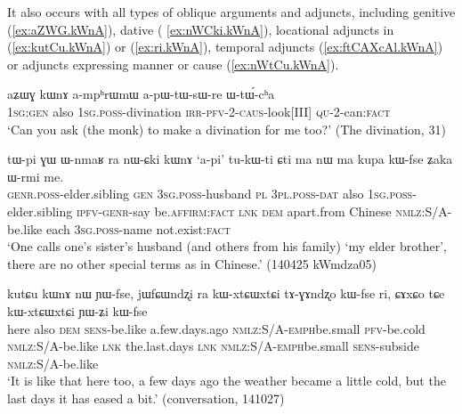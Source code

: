 It also occurs with all types of oblique arguments and adjuncts, including genitive (\ref{ex:aZWG.kWnA}), dative ( \ref{ex:nWCki.kWnA}),  locational adjuncts in  (\ref{ex:kutCu.kWnA}) or  (\ref{ex:ri.kWnA}), temporal adjuncts (\ref{ex:ftCAXcAl.kWnA}) or adjuncts expressing manner or cause (\ref{ex:nWtCu.kWnA}).  
  
   \begin{exe}
\ex \label{ex:aZWG.kWnA}
\gll aʑɯɣ kɯnɤ a-mpʰrɯmɯ a-pɯ-tɯ-sɯ-re ɯ-tɯ́-cʰa \\
\textsc{1sg}:\textsc{gen} also \textsc{1sg}.\textsc{poss}-divination \textsc{irr}-\textsc{pfv}-2-\textsc{caus}-look[III] \textsc{qu}-2-can:\textsc{fact} \\
\glt `Can you ask (the monk) to make a divination for me too?' (The divination, 31)
\end{exe}  
  
   \begin{exe}
\ex \label{ex:nWCki.kWnA}
\gll  tɯ-pi ɣɯ ɯ-nmaʁ ra nɯ-ɕki kɯnɤ `a-pi' tu-kɯ-ti ɕti ma nɯ ma kupa kɯ-fse ʑaka ɯ-rmi me. \\
\textsc{genr}.\textsc{poss}-elder.sibling \textsc{gen} \textsc{3sg}.\textsc{poss}-husband \textsc{pl} \textsc{3pl}.\textsc{poss}-\textsc{dat} also \textsc{1sg}.\textsc{poss}-elder.sibling \textsc{ipfv}-\textsc{genr}-say be.\textsc{affirm}:\textsc{fact} \textsc{lnk} \textsc{dem} apart.from Chinese \textsc{nmlz}:S/A-be.like each \textsc{3sg}.\textsc{poss}-name not.exist:\textsc{fact} \\
\glt  `One calls one's sister's husband (and others from his family) `my elder brother', there are no other special terms as in Chinese.' (140425 kWmdza05)
\end{exe}


  \begin{exe}
\ex \label{ex:kutCu.kWnA}
\gll  kutɕu kɯnɤ nɯ ɲɯ-fse, jɯfɕɯndʐi ra kɯ-xtɕɯ\redp{}xtɕi tɤ-ɣɤndʐo kɯ-fse ri, ɕɤxɕo tɕe kɯ-xtɕɯ\redp{}xtɕi ɲɯ-ʑi kɯ-fse \\
here also \textsc{dem} \textsc{sens}-be.like a.few.days.ago \textsc{nmlz}:S/A-\textsc{emph}\redp{}be.small \textsc{pfv}-be.cold \textsc{nmlz}:S/A-be.like \textsc{lnk} the.last.days \textsc{lnk} \textsc{nmlz}:S/A-\textsc{emph}\redp{}be.small \textsc{sens}-subside \textsc{nmlz}:S/A-be.like \\
\glt `It is like that here too, a few days ago the weather became a little cold, but the last days it has eased a bit.' (conversation, 141027)
  \end{exe}
  
